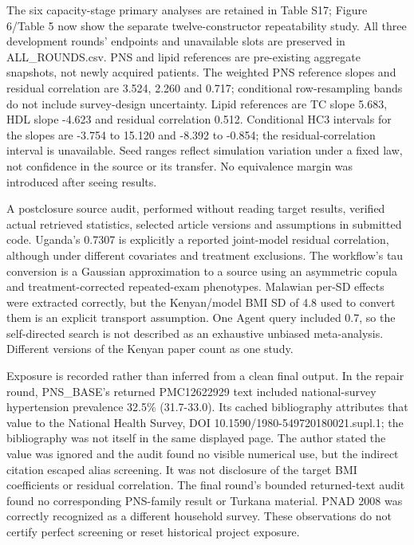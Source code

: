 \documentclass[11pt,letterpaper]{article}
\begin{document}
The six capacity-stage primary analyses are retained in Table S17; Figure 6/\allowbreak{}Table 5 now show the separate twelve-constructor repeatability study. All three development rounds' endpoints and unavailable slots are preserved in ALL\_ROUNDS.csv. PNS and lipid references are pre-existing aggregate snapshots, not newly acquired patients. The weighted PNS reference slopes and residual correlation are 3.524, 2.260 and 0.717; conditional row-resampling bands do not include survey-design uncertainty. Lipid references are TC slope 5.683, HDL slope -4.623 and residual correlation 0.512. Conditional HC3 intervals for the slopes are -3.754 to 15.120 and -8.392 to -0.854; the residual-correlation interval is unavailable. Seed ranges reflect simulation variation under a fixed law, not confidence in the source or its transfer. No equivalence margin was introduced after seeing results.


A postclosure source audit, performed without reading target results, verified actual retrieved statistics, selected article versions and assumptions in submitted code. Uganda's 0.7307 is explicitly a reported joint-model residual correlation, although under different covariates and treatment exclusions. The workflow's tau conversion is a Gaussian approximation to a source using an asymmetric copula and treatment-corrected repeated-exam phenotypes. Malawian per-SD effects were extracted correctly, but the Kenyan/\allowbreak{}model BMI SD of 4.8 used to convert them is an explicit transport assumption. One Agent query included 0.7, so the self-directed search is not described as an exhaustive unbiased meta-analysis. Different versions of the Kenyan paper count as one study.


Exposure is recorded rather than inferred from a clean final output. In the repair round, PNS\_BASE's returned PMC12622929 text included national-survey hypertension prevalence 32.5\% (31.7-33.0). Its cached bibliography attributes that value to the National Health Survey, DOI 10.1590/\allowbreak{}1980-549720180021.supl.1; the bibliography was not itself in the same displayed page. The author stated the value was ignored and the audit found no visible numerical use, but the indirect citation escaped alias screening. It was not disclosure of the target BMI coefficients or residual correlation. The final round's bounded returned-text audit found no corresponding PNS-family result or Turkana material. PNAD 2008 was correctly recognized as a different household survey. These observations do not certify perfect screening or reset historical project exposure.
\end{document}
